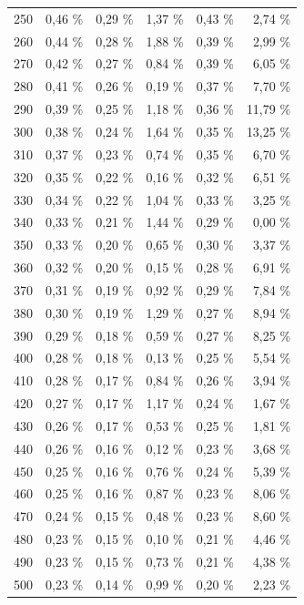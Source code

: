 \documentclass[11pt,twoside,a4paper]{report}
\begin{document}
{\begin{longtable}{rrrrrr}
    250   & 0,46 \% & 0,29 \% & 1,37 \% & 0,43 \% & 2,74 \% \\
    260   & 0,44 \% & 0,28 \% & 1,88 \% & 0,39 \% & 2,99 \% \\
    270   & 0,42 \% & 0,27 \% & 0,84 \% & 0,39 \% & 6,05 \% \\
    280   & 0,41 \% & 0,26 \% & 0,19 \% & 0,37 \% & 7,70 \% \\
    290   & 0,39 \% & 0,25 \% & 1,18 \% & 0,36 \% & 11,79 \% \\
    300   & 0,38 \% & 0,24 \% & 1,64 \% & 0,35 \% & 13,25 \% \\
    310   & 0,37 \% & 0,23 \% & 0,74 \% & 0,35 \% & 6,70 \% \\
    320   & 0,35 \% & 0,22 \% & 0,16 \% & 0,32 \% & 6,51 \% \\
    330   & 0,34 \% & 0,22 \% & 1,04 \% & 0,33 \% & 3,25 \% \\
    340   & 0,33 \% & 0,21 \% & 1,44 \% & 0,29 \% & 0,00 \% \\
    350   & 0,33 \% & 0,20 \% & 0,65 \% & 0,30 \% & 3,37 \% \\
    360   & 0,32 \% & 0,20 \% & 0,15 \% & 0,28 \% & 6,91 \% \\
    370   & 0,31 \% & 0,19 \% & 0,92 \% & 0,29 \% & 7,84 \% \\
    380   & 0,30 \% & 0,19 \% & 1,29 \% & 0,27 \% & 8,94 \% \\
    390   & 0,29 \% & 0,18 \% & 0,59 \% & 0,27 \% & 8,25 \% \\
    400   & 0,28 \% & 0,18 \% & 0,13 \% & 0,25 \% & 5,54 \% \\
    410   & 0,28 \% & 0,17 \% & 0,84 \% & 0,26 \% & 3,94 \% \\
    420   & 0,27 \% & 0,17 \% & 1,17 \% & 0,24 \% & 1,67 \% \\
    430   & 0,26 \% & 0,17 \% & 0,53 \% & 0,25 \% & 1,81 \% \\
    440   & 0,26 \% & 0,16 \% & 0,12 \% & 0,23 \% & 3,68 \% \\
    450   & 0,25 \% & 0,16 \% & 0,76 \% & 0,24 \% & 5,39 \% \\
    460   & 0,25 \% & 0,16 \% & 0,87 \% & 0,23 \% & 8,06 \% \\
    470   & 0,24 \% & 0,15 \% & 0,48 \% & 0,23 \% & 8,60 \% \\
    480   & 0,23 \% & 0,15 \% & 0,10 \% & 0,21 \% & 4,46 \% \\
    490   & 0,23 \% & 0,15 \% & 0,73 \% & 0,21 \% & 4,38 \% \\
    500   & 0,23 \% & 0,14 \% & 0,99 \% & 0,20 \% & 2,23 \% \\

\end{longtable}}
\end{document}
